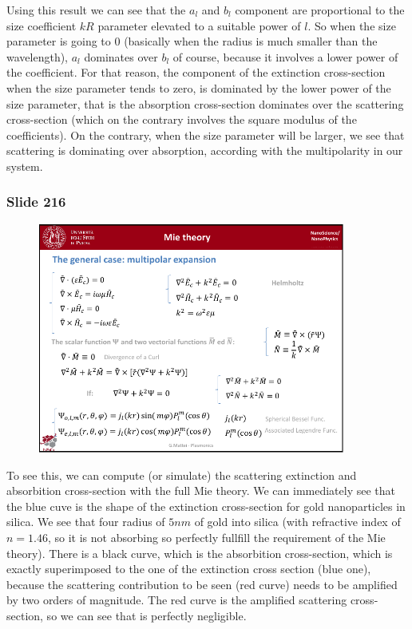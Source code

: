\documentclass[../main/main.tex]{subfiles}
\begin{document}
Using this result we can see that the $a_l$  and $b_l$ component are proportional to the size coefficient \( k R \) parameter elevated to a suitable power of \( l \). So when the size parameter is going to 0 (basically when the radius is much smaller than the wavelength),  $a_l$  dominates over $b_l$ of course, because it involves a lower power of the coefficient.
For that reason, the component of the extinction cross-section when the size parameter tends to zero,
is dominated by the lower power of the size parameter, that is the absorption cross-section dominates over the scattering cross-section (which on the contrary involves the square modulus of the coefficients).
On the contrary, when the size parameter will be larger, we see that scattering is dominating over absorption, according with the multipolarity in our system.

\newpage

\subsubsection{Slide 216}

\begin{figure}[h!]
\centering
\includegraphics[page=9,width=0.9\textwidth]{../lessons/pdf_file/13_lesson.pdf}
\end{figure}

To see this, we can compute (or simulate) the scattering extinction and absorbition cross-section with the full Mie theory. We can immediately see that the blue cuve is the shape of the extinction cross-section for gold nanoparticles in silica. We see that four radius of \( 5nm \) of gold into silica (with refractive index of \( n=1.46 \), so it is not absorbing so perfectly fullfill the requirement of the Mie theory). There is a black curve, which is the absorbition cross-section, which is exactly superimposed to the one of the extinction cross section (blue one), because the scattering contribution to be seen (red curve) needs to be amplified by two orders of magnitude. The red curve is the amplified scattering cross-section, so we can see that is perfectly negligible.
\end{document}
